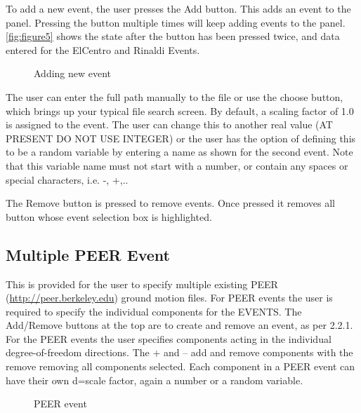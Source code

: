 To add a new event, the user presses the Add button. 
This adds an event to the panel. 
Pressing the button multiple times will keep adding events to the panel. 
\autoref{fig:figure5} shows the state after the button has been pressed twice, 
and data entered for the ElCentro and Rinaldi Events.

\begin{figure}[!htbp]
  \caption{Adding new event}
  \label{fig:figure5}
\end{figure}


The user can enter the full path manually to the file or use the choose button, 
which brings up your typical file search screen. 
By default, a scaling factor of 1.0 is assigned to the event. 
The user can change this to another real value (AT PRESENT DO NOT USE INTEGER) or the user 
has the option of defining this to be a random variable by entering a name as shown for the second event. 
Note that this variable name must not start with a number, or contain any spaces or special characters, i.e. -, +,..

The Remove button is pressed to remove events. 
Once pressed it removes all button whose event selection box is highlighted.

\subsection{Multiple PEER Event}
This is provided for the user to specify multiple existing PEER 
(\href{http://peer.berkeley.edu}{http://peer.berkeley.edu}) ground motion files. 
For PEER events the user is required to specify the individual components for the EVENTS. 
The Add/Remove buttons at the top are to create and remove an event, as per 2.2.1. 
For the PEER events the user specifies components acting in the individual degree-of-freedom directions. 
The + and – add and remove components with the remove removing all components selected. 
Each component in a PEER event can have their own d=scale factor, again a number or a random variable.
\begin{figure}[!htbp]
  \caption{PEER event}
  \label{fig:figure6}
\end{figure}

